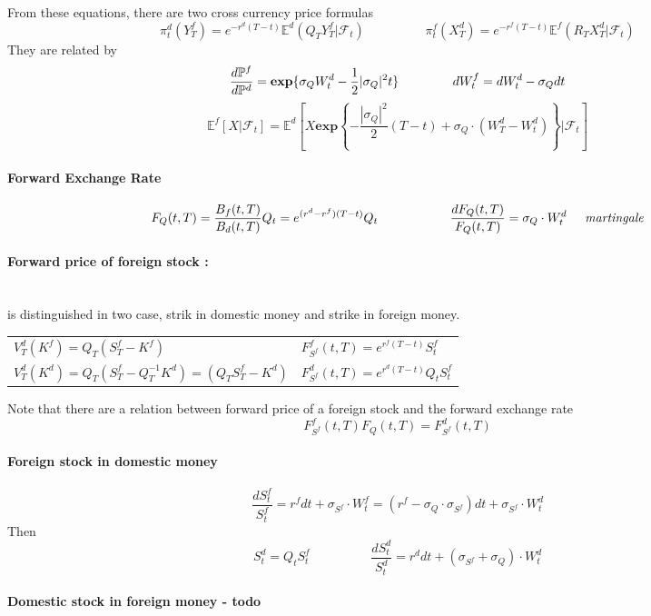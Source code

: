 \documentclass[a4paper,10pt]{article}
\begin{document}
From these equations, there are two cross currency price formulas
\[
\pi^d_t(Y^f_T) = e^{-r^d(T-t)}\mathbb{E}^d(Q_T Y^f_T|\mathcal{F}_t)
\hspace{2cm}
\pi^f_t(X^d_T) = e^{-r^f(T-t)}\mathbb{E}^f(R_T X^d_T|\mathcal{F}_t)
\]
They are related by
\[
\frac{d\mathbb{P}^f}{d\mathbb{P}^d}=\textbf{exp}\{\sigma_{Q}W^d_t - \frac{1}{2} |\sigma_{Q}|^2 t \}
\hspace{1.5cm}
dW^f_t = dW^d_t - \sigma_{Q}dt  
\]
\[
\mathbb{E}^f[X|\mathcal{F}_t] = \mathbb{E}^d[X\textbf{exp}\left\{ - \frac{|\sigma_{Q}|^2}{2}(T-t) +  \sigma_{Q}\cdot(W^d_T - W^d_t)\right\} |\mathcal{F}_t]
\]
\paragraph{Forward Exchange Rate}
\[
F_{Q}(t,T) = \frac{B_f(t,T)}{B_d(t,T)}Q_t = e^{(r^d - r^f)(T-t)}Q_t
\hspace{2cm}
\frac{d F_{Q}(t,T)}{F_{Q}(t,T)}= \sigma_{Q}\cdot W^d_t
\hspace{0.5cm}\textit{martingale}
\]
\paragraph{Forward price of foreign stock : } \mbox{} \\
is distinguished in two case, strik in domestic money and strike in foreign money. 
\begin{center}
\begin{tabular}{l|l}
 $V^d_T(K^f) = Q_T(S^f_T - K^f)  $                               &   $F^f_{S^f} (t,T) = e^{r^f(T-t)}S^f_t $    \\[6pt]
 $V^d_T(K^d) = Q_T(S^f_T - Q_T^{-1}K^d) = ( Q_TS^f_T - K^d)  $   &   $F^d_{S^f} (t,T) = e^{r^d(T-t)}Q_tS^f_t $
\end{tabular}
\end{center}
Note that there are a relation between forward price of a foreign stock and the forward exchange rate
\[
F^f_{S^f} (t,T) F_{Q}(t,T) = F^d_{S^f} (t,T)
\]
\paragraph{Foreign stock in domestic money}
\[
\frac{dS^f_t}{S^f_t} = r^f dt + \sigma_{S^f}\cdot W^f_t = (r^f - \sigma_{Q}\cdot\sigma_{S^f})dt + \sigma_{S^f}\cdot W^d_t
\]
Then
\[
S^d_t = Q_t S^f_t
\hspace{2cm}
\frac{dS^d_t}{S^d_t} = r^d dt + (\sigma_{S^f} + \sigma_{Q})\cdot W^d_t 
\]
\paragraph{Domestic stock in foreign money - todo}
\end{document}
